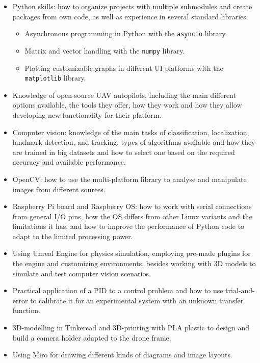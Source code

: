 \begin{itemize}
    \item Python skills: how to organize projects with multiple submodules and create packages from own code, as well as experience in several standard libraries:
    \begin{itemize}
        \item Asynchronous programming in Python with the \texttt{asyncio} library.
        \item Matrix and vector handling with the \texttt{numpy} library.
        \item Plotting customizable graphs in different UI platforms with the \texttt{matplotlib} library.
    \end{itemize}

    \item Knowledge of open-source UAV autopilots, including the main different options available, the tools they offer, how they work and how they allow developing new functionality for their platform.

    \item Computer vision: knowledge of the main tasks of classification, localization, landmark detection, and tracking, types of algorithms available and how they are trained in big datasets and how to select one based on the required accuracy and available performance.

    \item OpenCV: how to use the multi-platform library to analyse and manipulate images from different sources.

    \item Raspberry Pi board and Raspberry OS: how to work with serial connections from general I/O pins, how the OS differs from other Linux variants and the limitations it has, and how to improve the performance of Python code to adapt to the limited processing power.

    \item Using Unreal Engine for physics simulation, employing pre-made plugins for the engine and customizing environments, besides working with 3D models to simulate and test computer vision scenarios.

    \item Practical application of a PID to a control problem and how to use trial-and-error to calibrate it for an experimental system with an unknown transfer function.

    \item 3D-modelling in Tinkercad and 3D-printing with PLA plastic to design and build a camera holder adapted to the drone frame.

    \item Using Miro for drawing different kinds of diagrams and image layouts.
\end{itemize}


